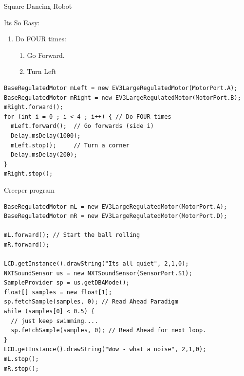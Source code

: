 \documentclass[color=pdftex,usenames,dvipsnames, aspectratio=169]{beamer}
\begin{document}

\begin{frame}[fragile]{Square Dancing Robot}
\begin{block}{Its So Easy:}
\begin{enumerate}
 \item Do FOUR times:
\begin{enumerate}
 \item Go Forward.
 \item Turn Left
\end{enumerate}
\end{enumerate}
\end{block}

\begin{lstlisting}[basicstyle=\ttfamily\small\color{blue}]
BaseRegulatedMotor mLeft = new EV3LargeRegulatedMotor(MotorPort.A);
BaseRegulatedMotor mRight = new EV3LargeRegulatedMotor(MotorPort.B);
mRight.forward();
for (int i = 0 ; i < 4 ; i++) { // Do FOUR times
  mLeft.forward();  // Go forwards (side i)
  Delay.msDelay(1000);
  mLeft.stop();     // Turn a corner
  Delay.msDelay(200);
}
mRight.stop();
\end{lstlisting}

\end{frame}
\begin{frame}[fragile]{Creeper program}
\begin{lstlisting}[basicstyle=\ttfamily\scriptsize\color{blue}]
BaseRegulatedMotor mL = new EV3LargeRegulatedMotor(MotorPort.A);
BaseRegulatedMotor mR = new EV3LargeRegulatedMotor(MotorPort.D);

mL.forward(); // Start the ball rolling
mR.forward();

LCD.getInstance().drawString("Its all quiet", 2,1,0);
NXTSoundSensor us = new NXTSoundSensor(SensorPort.S1);
SampleProvider sp = us.getDBAMode();
float[] samples = new float[1];
sp.fetchSample(samples, 0); // Read Ahead Paradigm
while (samples[0] < 0.5) {
  // just keep swimming....
  sp.fetchSample(samples, 0); // Read Ahead for next loop.
}
LCD.getInstance().drawString("Wow - what a noise", 2,1,0);
mL.stop();
mR.stop();
\end{lstlisting}
\end{frame}
\end{document}
